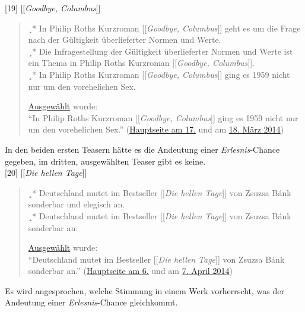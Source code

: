\documentclass[fontsize=12pt]{scrartcl}
\begin{document}
[19] [[\textit{Goodbye, Columbus}]]
\singlespacing
\begin{quote}
¸* In Philip Roths Kurzroman [[\textit{Goodbye, Columbus}]] geht es um die Frage nach der G\"ultigkeit \"uberlieferter Normen und Werte.\\
¸* Die Infragestellung der G\"ultigkeit \"uberlieferter Normen und Werte ist ein Thema in Philip Roths Kurzroman [[\textit{Goodbye, Columbus}]].\\
¸* In Philip Roths Kurzroman [[\textit{Goodbye, Columbus}]] ging es 1959 nicht nur um den vor\-ehelichen Sex.

\href{https://de.wikipedia.org/wiki/Wikipedia_Diskussion:Hauptseite/Schon_gewusst/Diskussionsarchiv/2014/Februar#Vorschlag:_Goodbye.2C_Columbus_.288._Februar_2014.29_.28erl..29}{Ausgew\"ahlt} wurde:\\
"`In Philip Roths Kurzroman [[\textit{Goodbye, Columbus}]] ging es 1959 nicht nur um den vor\-ehelichen Sex."' (\href{https://de.wikipedia.org/wiki/Wikipedia:Hauptseite/Archiv/17._M\%C3\%A4rz_2014}{Hauptseite am 17.} und am \href{https://de.wikipedia.org/wiki/Wikipedia:Hauptseite/Archiv/18._M\%C3\%A4rz_2014}{18. M\"arz 2014})
\end{quote}
\onehalfspacing

In den beiden ersten Teasern h\"atte es die Andeutung einer \textit{Erlesnis}-Chance gegeben, im dritten, ausgew\"ahlten Teaser gibt es keine.\\

[20] [[\textit{Die hellen Tage}]]
\singlespacing
\begin{quote}
¸* Deutschland mutet im Bestseller [[\textit{Die hellen Tage}]] von Zsuzsa B\'{a}nk sonderbar und elegisch an.\\
¸* Deutschland mutet im Bestseller [[\textit{Die hellen Tage}]] von Zsuzsa B\'{a}nk sonderbar an.

\href{https://de.wikipedia.org/wiki/Wikipedia_Diskussion:Hauptseite/Schon_gewusst/Diskussionsarchiv/2014/M\%C3\%A4rz#Eigenvorschlag:_Die_hellen_Tage_.283._M.C3.A4rz_2014.29_.28erl..29}{Ausgew\"ahlt} wurde:\\
"`Deutschland mutet im Bestseller [[\textit{Die hellen Tage}]] von Zsuzsa B\'{a}nk sonderbar an."' (\href{https://de.wikipedia.org/wiki/Wikipedia:Hauptseite/Archiv/6._April_2014}{Hauptseite am 6.} und am \href{https://de.wikipedia.org/wiki/Wikipedia:Hauptseite/Archiv/7._April_2014}{7. April 2014})
\end{quote}
\onehalfspacing

Es wird an\-ge\-spro\-chen, welche Stimmung in einem Werk vorherrscht, was der Andeutung einer \textit{Erlesnis}-Chance gleichkommt.\\
\end{document}
